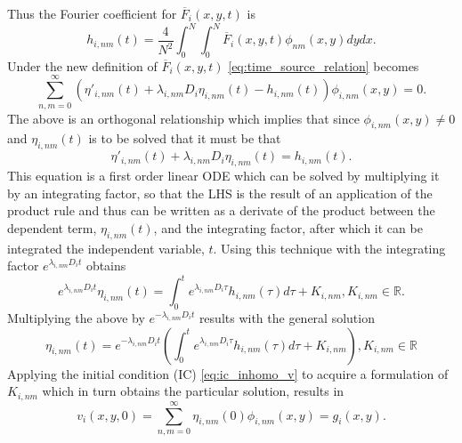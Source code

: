 \documentclass[\main/thesis.tex]{subfiles}
\begin{document}
Thus the Fourier coefficient for $\overline{F}_{i}(x, y, t)$ is 
\begin{equation}
	h_{i,nm}(t) {=} \frac{4}
	                     {N^2}
	                \int_{0}^{N} \int_{0}^{N} \overline{F}_i(x, y, t)
	                                          \phi_{nm}(x, y) dydx. 
	\label{eq:fourier_coeff_F}
\end{equation} 
Under the new definition of $\overline{F}_{i}(x, y, t)$ 
\eqref{eq:time_source_relation} becomes
\begin{equation*}
	    \sum_{n,m {=} 0}^{\infty}
	      \left(
	            \eta'_{i,nm}(t)
	        {+} \lambda_{i,nm} D_i \eta_{i,nm}(t)
	        {-} h_{i,nm}(t) 
	      \right) 
	      \phi_{i,nm}(x, y)
    {=} 0.
\end{equation*}
The above is an orthogonal relationship which implies that since
$\phi_{i,nm}(x, y) {\ne} 0$ and $\eta_{i,nm}(t)$ is to be solved that it must be 
that
\begin{equation*}
	\eta'_{i,nm}(t) {+} \lambda_{i,nm} D_i \eta_{i,nm}(t) {=} h_{i,nm}(t).
\end{equation*}
This equation is a first order linear ODE which can be solved by multiplying it 
by an integrating factor, so that the LHS is the result of an application of the 
product rule and thus can be written as a derivate of the product between the 
dependent term, $\eta_{i,nm}(t)$, and the integrating factor, after which it can 
be integrated \wrt the independent variable, $t$. Using this technique with the 
integrating factor $e^{\lambda_{i,nm} D_i t}$ obtains  
\begin{equation*}
	    e^{\lambda_{i,nm} D_i t} \eta_{i,nm}(t)
	{=}
	    \int_{0}^{t} e^{\lambda_{i,nm} D_i \tau} h_{i,nm}(\tau) d\tau
	{+} K_{i,nm}, 
	K_{i,nm} {\in} \mathbb{R}.
\end{equation*}
Multiplying the above by $e^{\minus \lambda_{i,nm} D_i t}$ results with the general solution
\begin{equation}
	\eta_{i,nm}(t) {=} e^{\minus \lambda_{i,nm} D_i t}
	                   \left( 
	                         \int_{0}^{t} e^{\lambda_{i,nm} D_i \tau} 
	                                      h_{i,nm}(\tau) d\tau
	                     {+} K_{i,nm}
	                   \right),
	K_{i,nm} {\in} \mathbb{R}
	\label{eq:time_depen_sol}
\end{equation}
Applying the initial condition (IC) \eqref{eq:ic_inhomo_v} to acquire a 
formulation of $K_{i,nm}$ which in turn obtains the particular solution, results in
\begin{equation*}
	v_{i}(x, y, 0) {=} \sum_{n,m {=} 0}^{\infty} \eta_{i,nm}(0) \phi_{i,nm}(x, y)
	               {=} g_i(x, y).
\end{equation*}
\end{document}
